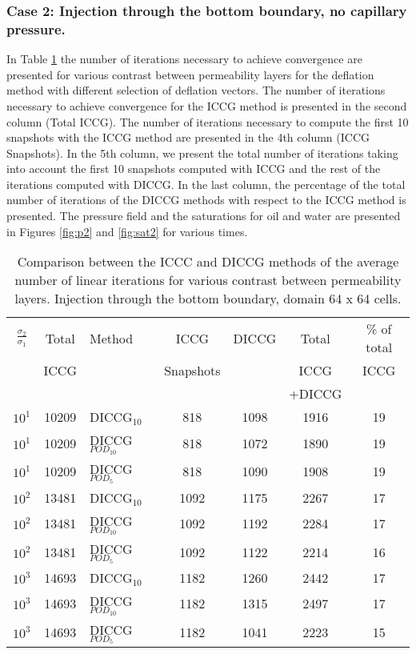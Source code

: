 \documentclass[12pt]{article}
\begin{document}
\subsubsection*{Case 2: Injection through the bottom boundary, no capillary pressure.}
In Table \ref{table:liter2} the number of iterations necessary to achieve convergence are presented for various contrast between permeability layers for the deflation method with different selection of deflation vectors. The number of iterations necessary to achieve convergence for the ICCG method is presented in the second column (Total ICCG). The number of iterations necessary to compute the first 10 snapshots with the ICCG method are presented in the 4th column (ICCG Snapshots). In the 5th column, we present the total number of iterations taking into account the first 10 snapshots computed with ICCG and the rest of the iterations computed with DICCG. In the last column, the percentage of the total number of iterations of the DICCG methods with respect to the ICCG method is presented.   
The pressure field and the saturations for oil and water are presented in Figures \ref{fig:p2} and \ref{fig:sat2} for various times.
\begin{table}[!h]\centering
\begin{minipage}{1\textwidth}
 \centering
\begin{tabular}{ ||c|c||l|c|c|c|c||} 
\hline
$\frac{\sigma_2}{\sigma_1}$&Total&Method  & ICCG&DICCG &Total&\% of total\\ 
                           & ICCG     &  & Snapshots& &ICCG& ICCG\\ 
                            &     &  & & &+DICCG& \\
\hline 
$10^{1}$ &10209& DICCG$_{10}$&818&1098&1916&19\\ 
\hline  
$10^{1}$ &10209& DICCG$_{POD_{10}}$&818&1072&1890&19 \\ 
\hline  
$10^{1}$ &10209& DICCG$_{POD_{5}}$&818&1090&1908&19 \\ 
\hline 
$10^{2}$ &13481& DICCG$_{10}$&1092&1175&2267&17\\ 
\hline  
$10^{2}$ &13481& DICCG$_{POD_{10}}$&1092&1192&2284&17 \\ 
\hline  
$10^{2}$ &13481& DICCG$_{POD_{5}}$&1092&1122&2214&16 \\ 
\hline  
$10^{3}$ &14693& DICCG$_{10}$&1182&1260&2442&17\\ 
\hline  
$10^{3}$ &14693& DICCG$_{POD_{10}}$&1182&1315&2497&17 \\ 
\hline  
$10^{3}$ &14693& DICCG$_{POD_{5}}$&1182&1041&2223&15 \\ 
\hline  
\end{tabular} 
\caption{Comparison between the ICCC and DICCG methods of the average number of linear iterations for various contrast between permeability layers. Injection through the bottom boundary, domain 64 x 64 cells.}\label{table:liter2} 
\end{minipage}  
\end{table}  
\end{document}
